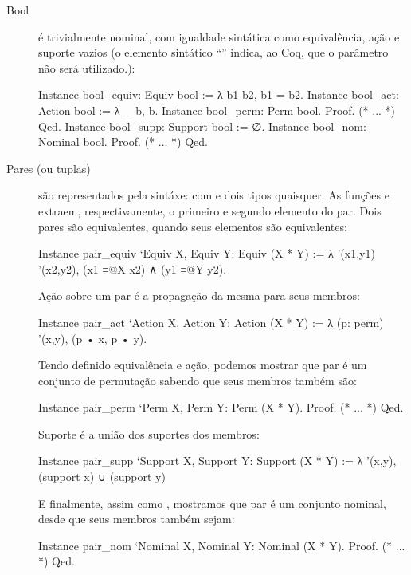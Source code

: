 \begin{description}
	\item [Bool] é trivialmente nominal, com igualdade sintática como equivalência, ação e suporte vazios (o elemento sintático ``\coqinline{_}'' indica, ao Coq, que o parâmetro não será utilizado.):
	\begin{coqcode}
Instance bool_equiv: Equiv bool := λ b1 b2, b1 = b2.
Instance bool_act: Action bool := λ _ b, b.
Instance bool_perm: Perm bool. Proof. (* ... *) Qed.
Instance bool_supp: Support bool := ∅.
Instance bool_nom: Nominal bool. Proof. (* ... *) Qed.
	\end{coqcode}
	
	\item[Pares (ou tuplas)] são representados pela sintáxe:  com  e  dois tipos quaisquer. As funções  e  extraem, respectivamente, o primeiro e segundo elemento do par. Dois pares são equivalentes, quando seus elementos são equivalentes:
	\begin{coqcode}
Instance pair_equiv `{Equiv X, Equiv Y}: Equiv (X * Y) :=
   λ '(x1,y1) '(x2,y2), (x1 ≡@{X} x2) ∧ (y1 ≡@{Y} y2).
	\end{coqcode}
	Ação sobre um par é a propagação da mesma para seus membros:
	\begin{coqcode}
Instance pair_act `{Action X, Action Y}: Action (X * Y) :=
   λ (p: perm) '(x,y), (p • x, p • y).
	\end{coqcode}
	Tendo definido equivalência e ação, podemos mostrar que par é um conjunto de permutação sabendo que seus membros também são:
	\begin{coqcode}
Instance pair_perm `{Perm X, Perm Y}: Perm (X * Y).
Proof. (* ... *) Qed.
	\end{coqcode}
	Suporte é a união dos suportes dos membros:
	\begin{coqcode}
Instance pair_supp `{Support X, Support Y}: Support (X * Y) :=
   λ '(x,y), (support x) ∪ (support y)
	\end{coqcode}
	E finalmente, assim como , mostramos que par é um conjunto nominal, desde que seus membros também sejam:
	\begin{coqcode}
Instance pair_nom `{Nominal X, Nominal Y}: Nominal (X * Y).
Proof. (* ... *) Qed.	
	\end{coqcode}


\end{description}

